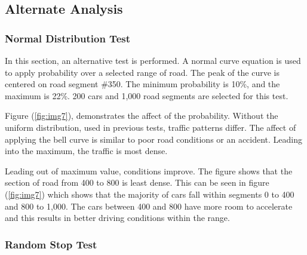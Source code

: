 \documentclass[12pt]{extarticle}
\begin{document}
\subsection{Alternate Analysis}
\subsubsection{Normal Distribution Test}


In this section, an alternative test is performed. A normal curve equation is used to apply probability over a selected range of road. The peak of the curve is centered on road segment \#350. The minimum probability is 10\%, and the maximum is 22\%. 200 cars and 1,000 road segments are selected for this test.

Figure (\ref{fig:img7}), demonstrates the affect of the probability. Without the uniform distribution, used in previous tests, traffic patterns differ. The affect of applying the bell curve is similar to poor road conditions or an accident. Leading into the maximum, the traffic is most dense. 

Leading out of maximum value, conditions improve. The figure shows that the section of road from 400 to 800 is least dense. This can be seen in figure (\ref{fig:img7}) which shows that the majority of cars fall within segments 0 to 400 and 800 to 1,000. The cars between 400 and 800 have more room to accelerate and this results in better driving conditions within the range.

\subsubsection{Random Stop Test}
\end{document}
